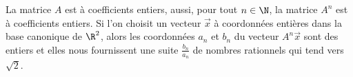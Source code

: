 {\begin{enumerate}
{La matrice $A$ est \`a coefficients entiers, aussi, pour tout $n\in\N$, la matrice $A^n$ est \`a coefficients entiers. Si l'on choisit un vecteur $\vec x$ \`a coordonn\'ees enti\`eres dans la base canonique de $\R^2$, alors les coordonn\'ees $a_n$ et $b_n$ du vecteur $A^n\vec x$ sont des entiers et elles nous fournissent une suite $\displaystyle{\frac{b_n}{a_n}}$ de nombres rationnels qui tend vers $\sqrt2$.}
\end{enumerate}
}